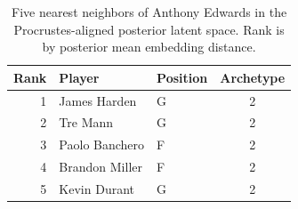 \begin{table}[htbp]
  \centering\small
  \begin{tabular}{rllc}
    \toprule
    Rank & Player & Position & Archetype \\
    \midrule
    1 & James Harden & G & 2 \\
    2 & Tre Mann & G & 2 \\
    3 & Paolo Banchero & F & 2 \\
    4 & Brandon Miller & F & 2 \\
    5 & Kevin Durant & G & 2 \\
    \bottomrule
  \end{tabular}
  \caption{Five nearest neighbors of Anthony Edwards in the Procrustes-aligned posterior latent space. Rank is by posterior mean embedding distance.}
  \label{tab:Anthony_Edwards_neighbors}
\end{table}

